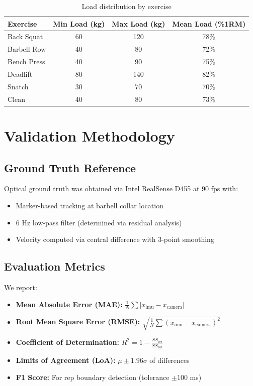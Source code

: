 \begin{table}[h]
    \centering
    \caption{Load distribution by exercise}
    \label{tab:load_range}
    \begin{tabular}{lccc}
        \toprule
        \textbf{Exercise} & \textbf{Min Load (kg)} & \textbf{Max Load (kg)} & \textbf{Mean Load (\%1RM)} \\
        \midrule
        Back Squat & 60 & 120 & 78\% \\
        Barbell Row & 40 & 80 & 72\% \\
        Bench Press & 40 & 90 & 75\% \\
        Deadlift & 80 & 140 & 82\% \\
        Snatch & 30 & 70 & 70\% \\
        Clean & 40 & 80 & 73\% \\
        \bottomrule
    \end{tabular}
\end{table}

\section{Validation Methodology}

\subsection{Ground Truth Reference}

Optical ground truth was obtained via Intel RealSense D455 at 90 fps with:
\begin{itemize}
    \item Marker-based tracking at barbell collar location
    \item 6 Hz low-pass filter (determined via residual analysis)
    \item Velocity computed via central difference with 3-point smoothing
\end{itemize}

\subsection{Evaluation Metrics}

We report:
\begin{itemize}
    \item \textbf{Mean Absolute Error (MAE):} $\frac{1}{N} \sum |x_{\text{imu}} - x_{\text{camera}}|$
    \item \textbf{Root Mean Square Error (RMSE):} $\sqrt{\frac{1}{N} \sum (x_{\text{imu}} - x_{\text{camera}})^2}$
    \item \textbf{Coefficient of Determination:} $R^2 = 1 - \frac{SS_{\text{res}}}{SS_{\text{tot}}}$
    \item \textbf{Limits of Agreement (LoA):} $\mu \pm 1.96\sigma$ of differences
    \item \textbf{F1 Score:} For rep boundary detection (tolerance $\pm$100 ms)
\end{itemize}


